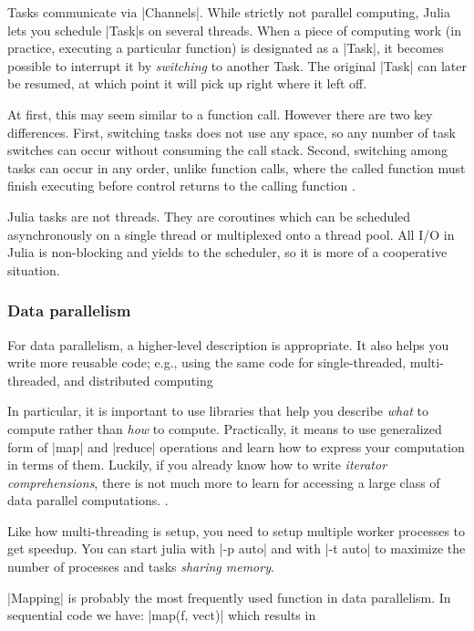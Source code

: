 Tasks communicate via |Channels|. While strictly not parallel computing, Julia lets you schedule |Task|s on several threads. When a piece of computing work (in practice, executing a particular function) is designated as a |Task|, it becomes possible to interrupt it by \emph{switching} to another Task. The original |Task| can later be resumed, at which point it will pick up right where it left off. 

At first, this may seem similar to a function call. However there are two key differences. First, switching tasks does not use any space, so any number of task switches can occur without consuming the call stack. Second, switching among tasks can occur in any order, unlike function calls, where the called function must finish executing before control returns to the calling function \cite{julia:parallel:data-parallelism}.

Julia tasks are not threads. They are coroutines which can be scheduled asynchronously on a single thread or multiplexed onto a thread pool. All I/O in Julia is non-blocking and yields to the scheduler, so it is more of a cooperative situation.


\subsubsection*{Data parallelism}

For data parallelism, a higher-level description is appropriate. It also helps you write more reusable code; e.g., using the same code for single-threaded, multi-threaded, and distributed computing

In particular, it is important to use libraries that help you describe \emph{what} to compute rather than \emph{how} to compute. Practically, it means to use generalized form of |map| and |reduce| operations and learn how to express your computation in terms of them. Luckily, if you already know how to write \emph{iterator comprehensions}, there is not much more to learn for accessing a large class of data parallel computations. \cite{julia:parallel:data-parallelism}. 

Like how multi-threading is setup, you need to setup multiple worker processes to get speedup. You can start julia with |-p auto| and with |-t auto| to maximize the number of processes and tasks \emph{sharing memory}.

|Mapping| is probably the most frequently used function in data parallelism. 
In sequential code we have: |map(f, vect)| which results in 

